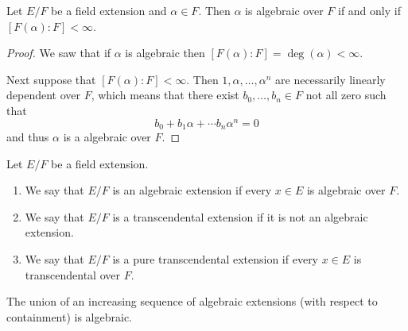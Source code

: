 \documentclass[11pt,a4paper]{article}
\begin{document}
\begin{proposition}
  Let $E/F$ be a field extension and $\alpha \in F$.
  Then $\alpha$ is algebraic over $F$ if and only if
  $[F(\alpha) : F] < \infty$.
\end{proposition}
\begin{proof}
  We saw that if $\alpha$ is algebraic then
  $\left[F(\alpha) : F\right] = \deg(\alpha) < \infty$.

  Next suppose that $[F(\alpha) : F] < \infty$.
  Then $1,\alpha,\dots,\alpha^n$ are necessarily linearly dependent over $F$,
  which means that there exist $b_0,\dots,b_n \in F$ not all zero such that
  \[
    b_0 + b_1 \alpha + \cdots b_n \alpha^n = 0
  \]
  and thus $\alpha$ is a algebraic over $F$.
\end{proof}

\begin{definition}
  Let $E/F$ be a field extension.
  \begin{enumerate}
    \item[(1)] We say that $E/F$ is an algebraic extension if every
      $x \in E$ is algebraic over $F$.
    \item[(2)] We say that $E/F$ is a transcendental extension
      if it is not an algebraic extension.
    \item[(3)] We say that $E/F$ is a pure transcendental extension if every
      $x \in E$ is transcendental over $F$.
  \end{enumerate}
\end{definition}

\begin{remark}
  The union of an increasing sequence of algebraic extensions 
  (with respect to containment) is algebraic.
\end{remark}
\end{document}
